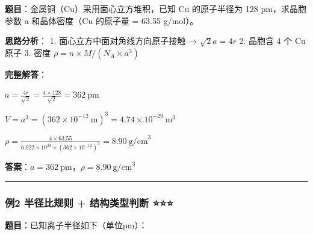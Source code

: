 \textbf{题目}：金属铜（Cu）采用面心立方堆积，已知 Cu 的原子半径为 128 pm，求晶胞参数 a 和晶体密度（Cu 的原子量 = 63.55 g/mol）。

\textbf{思路分析}：
1. 面心立方中面对角线方向原子接触 → \(\sqrt{2}a = 4r\)
2. 晶胞含 4 个 Cu 原子
3. 密度 \(\rho = n \times M / (N_A \times a^3)\)

\textbf{完整解答}：

\(a = \frac{4r}{\sqrt{2}} = \frac{4 \times 128}{\sqrt{2}} = 362\ \mathrm{pm}\)

\(V = a^3 = (362 \times 10^{-12}\ \mathrm{m})^3 = 4.74 \times 10^{-29}\ \mathrm{m}^3\)

\(\rho = \frac{4 \times 63.55}{6.022 \times 10^{23} \times (362 \times 10^{-12})^3} = 8.90\ \mathrm{g/cm}^3\)

\textbf{答案}：\(a = 362\ \mathrm{pm}\)，\(\rho = 8.90\ \mathrm{g/cm}^3\)

\begin{center}\rule{0.5\linewidth}{0.5pt}\end{center}

\subsubsection{例2 半径比规则 + 结构类型判断 ⭐⭐⭐}\label{ux4f8b2-ux534aux5f84ux6bd4ux89c4ux5219-ux7ed3ux6784ux7c7bux578bux5224ux65ad}

\textbf{题目}：已知离子半径如下（单位pm）：

